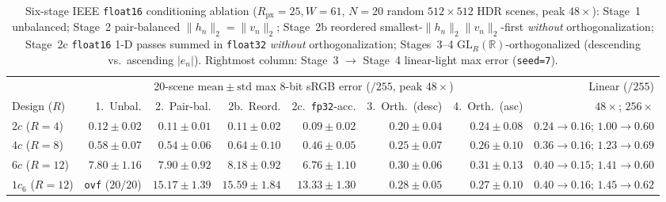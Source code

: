 \documentclass[11pt,a4paper]{article}
\theoremstyle{plain}
\theoremstyle{definition}
\newcommand{\R}{\mathbb{R}}
\begin{document}
\begin{table}[h]
\centering
\caption{Six-stage IEEE \texttt{float16} conditioning ablation ($R_{\mathrm{px}} = 25, W = 61$, $N = 20$ random $512 \times 512$ HDR scenes, peak $48\times$): Stage~1 unbalanced; Stage~2 pair-balanced $\|h_n\|_2 = \|v_n\|_2$; Stage~2b reordered smallest-$\|h_n\|_2\|v_n\|_2$-first \emph{without} orthogonalization; Stage~2c \texttt{float16} 1-D passes summed in \texttt{float32} \emph{without} orthogonalization; Stages~3--4 $\mathrm{GL}_R(\R)$-orthogonalized (descending vs.\ ascending $|e_n|$). Rightmost column: Stage~3 $\to$ Stage~4 linear-light max error (\texttt{seed=7}).}\label{tab:blur_ablation}
\smallskip
{\scriptsize\setlength{\tabcolsep}{1.7pt}
\begin{tabular}{@{}lrrrrrrr@{}}
\toprule
 & \multicolumn{6}{c}{20-scene $\mathrm{mean} \pm \mathrm{std}$ max 8-bit sRGB error ($/255$, peak $48\times$)} & Linear ($/255$) \\
\cmidrule(lr){2-7}\cmidrule(l){8-8}
Design ($R$) & 1.\ Unbal. & 2.\ Pair-bal. & 2b.\ Reord. & 2c.\ \texttt{fp32}-acc. & 3.\ Orth.\ (desc) & 4.\ Orth.\ (asc) & $48\times$;\; $256\times$ \\
\midrule
$2c$ ($R{=}4$) & $0.12 \pm 0.02$ & $0.11 \pm 0.01$ & $0.11 \pm 0.02$ & $0.09 \pm 0.02$ & $0.20 \pm 0.04$ & $0.24 \pm 0.08$ & $0.24{\to}\mathbf{0.16}$;\; $1.00{\to}\mathbf{0.60}$ \\
$4c$ ($R{=}8$) & $0.58 \pm 0.07$ & $0.54 \pm 0.06$ & $0.64 \pm 0.10$ & $0.46 \pm 0.05$ & $0.25 \pm 0.07$ & $0.26 \pm 0.10$ & $0.36{\to}\mathbf{0.16}$;\; $1.23{\to}\mathbf{0.69}$ \\
$6c$ ($R{=}12$) & $7.80 \pm 1.16$ & $7.90 \pm 0.92$ & $8.18 \pm 0.92$ & $6.76 \pm 1.10$ & $\mathbf{0.30 \pm 0.06}$ & $\mathbf{0.31 \pm 0.13}$ & $0.40{\to}\mathbf{0.15}$;\; $1.41{\to}\mathbf{0.60}$ \\
$1c_6$ ($R{=}12$) & \texttt{ovf} ($20/20$) & $15.17 \pm 1.39$ & $15.59 \pm 1.84$ & $13.33 \pm 1.30$ & $\mathbf{0.28 \pm 0.05}$ & $\mathbf{0.27 \pm 0.10}$ & $0.40{\to}\mathbf{0.16}$;\; $1.45{\to}\mathbf{0.62}$ \\
\bottomrule
\end{tabular}}
\end{table}
\end{document}
